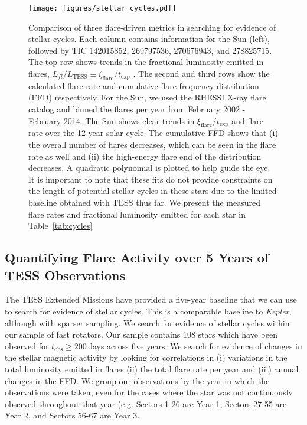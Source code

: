 \documentclass[twocolumn, linenumbers]{aastex631}
\begin{document}
\begin{sidewaysfigure*}[ht!]
    \vspace{-10cm}
    \begin{centering}
        \texttt{[image: figures/stellar\_cycles.pdf]}
        \caption{
            Comparison of three flare-driven metrics in searching for evidence of stellar cycles. Each column contains information for the Sun (left), followed by TIC 142015852,
            269797536, 270676943, and 278825715. The top row shows trends in the fractional luminosity emitted in flares, $L_{fl}/L_\textrm{TESS} \equiv \xi_\textrm{flare}/t_\textrm{exp}$
            \citep{lurie15}. The second and third rows show the calculated flare rate and cumulative flare frequency distribution (FFD) respectively. For the Sun, we used the RHESSI X-ray
            flare catalog and binned the flares per year from February 2002 - February 2014. The Sun shows clear trends in $\xi_\textrm{flare}/t_\textrm{exp}$ and flare rate over the 12-year
            solar cycle. The cumulative FFD shows that (i) the overall number of flares decreases, which can be seen in the flare rate as well and (ii)  the high-energy flare end of the
            distribution decreases. A quadratic polynomial is plotted to help guide the eye. It is important to note that these fits do not provide constraints on the length of potential
            stellar cycles in these stars due to the limited baseline obtained with TESS thus far. We present the measured flare rates and fractional luminosity emitted for each star in Table~\ref{tab:cycles}
        }
        \label{fig:stellar_cycles}
    \end{centering}
\end{sidewaysfigure*}

\subsection{Quantifying Flare Activity over 5 Years of TESS Observations}

The TESS Extended Missions have provided a five-year baseline that we can use to search for evidence of stellar cycles. This is a comparable baseline to \textit{Kepler}, although with sparser
sampling. We search for evidence of stellar cycles  within our sample of fast rotators. Our sample contains 108 stars which have been observed for $t_\textrm{obs} \geq 200$\,days across five
years. We search for evidence of changes in the stellar magnetic activity by looking for correlations in (i) variations in the total luminosity emitted in flares  (ii) the total flare rate per
year and (iii) annual changes in the FFD.  We group our observations by the year in which the observations were taken, even for the cases where the star was not continuously observed throughout
that year (e.g. Sectors 1-26 are Year 1, Sectors 27-55 are Year 2, and Sectors 56-67 are Year 3.
\end{document}

